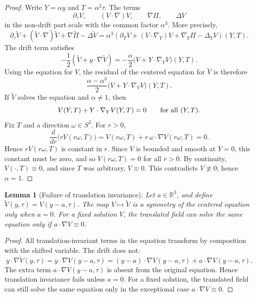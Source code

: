 \documentclass[11pt]{amsart}
\theoremstyle{plain}
\newtheorem{lemma}[theorem]{Lemma}
\theoremstyle{definition}
\theoremstyle{remark}
\numberwithin{equation}{section}
\newcommand{\R}{\mathbb R}
\begin{document}
\begin{proof}
Write \(Y=\alpha y\) and \(T=\alpha^2\tau\).  The terms
\[
   \partial_\tau V,\qquad (V\cdot\nabla)V,\qquad \nabla\Pi,\qquad \Delta V
\]
in the non-drift part scale with the common factor \(\alpha^3\).  More
precisely,
\[
   \partial_\tau\widetilde V
   +(\widetilde V\cdot\nabla)\widetilde V
   +\nabla\widetilde\Pi-\Delta\widetilde V
   =
   \alpha^3
   \left(\partial_TV+(V\cdot\nabla_Y)V+\nabla_Y\Pi-\Delta_YV\right)(Y,T).
\]
The drift term satisfies
\[
   -\frac12(\widetilde V+y\cdot\nabla\widetilde V)
   =
   -\frac{\alpha}{2}
   \bigl(V+Y\cdot\nabla_Y V\bigr)(Y,T).
\]
Using the equation for \(V\), the residual of the centered equation for
\(\widetilde V\) is therefore
\[
   \frac{\alpha-\alpha^3}{2}
   \bigl(V+Y\cdot\nabla_YV\bigr)(Y,T).
\]
If \(\widetilde V\) solves the equation and \(\alpha\ne1\), then
\[
   V(Y,T)+Y\cdot\nabla_YV(Y,T)=0
   \qquad\hbox{for all }(Y,T).
\]
Fix \(T\) and a direction \(\omega\in S^2\).  For \(r>0\),
\[
   \frac{d}{dr}\bigl(rV(r\omega,T)\bigr)
   =
   V(r\omega,T)+r\,\omega\cdot\nabla V(r\omega,T)=0.
\]
Hence \(rV(r\omega,T)\) is constant in \(r\).  Since \(V\) is bounded and
smooth at \(Y=0\), this constant must be zero, and so \(V(r\omega,T)=0\) for
all \(r>0\).  By continuity, \(V(\cdot,T)\equiv0\), and since \(T\) was
arbitrary, \(V\equiv0\).  This contradicts \(V\not\equiv0\); hence
\(\alpha=1\).
\end{proof}

\begin{lemma}[Failure of translation invariance]\label{lem:no-translation}
Let \(a\in\R^3\), and define \(\widetilde V(y,\tau)=V(y-a,\tau)\).  The map
\(V\mapsto\widetilde V\) is a symmetry of the centered equation only when
\(a=0\).  For a fixed solution \(V\), the translated field can solve the same
equation only if \(a\cdot\nabla V\equiv0\).
\end{lemma}

\begin{proof}
All translation-invariant terms in the equation transform by composition with
the shifted variable.
The drift does not:
\[
   y\cdot\nabla\widetilde V(y,\tau)
   =
   y\cdot\nabla V(y-a,\tau)
   =
   (y-a)\cdot\nabla V(y-a,\tau)
   +a\cdot\nabla V(y-a,\tau).
\]
The extra term \(a\cdot\nabla V(y-a,\tau)\) is absent from the original
equation.  Hence translation invariance fails unless \(a=0\).  For a fixed
solution, the translated field can still solve the same equation only in the
exceptional case \(a\cdot\nabla V\equiv0\).
\end{proof}
\end{document}
